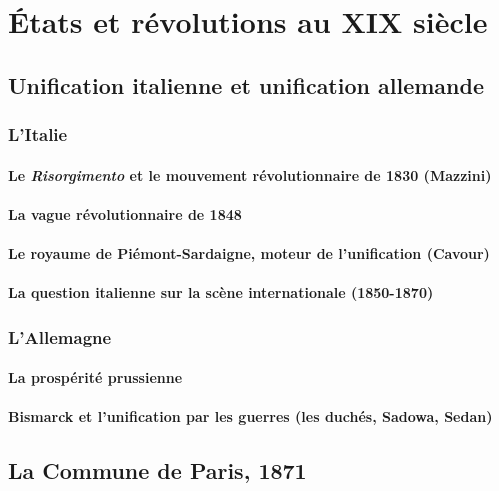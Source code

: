 \documentclass[12pt]{report}
\begin{document}
\chapter{États et révolutions au XIX siècle}

\section{Unification italienne et unification allemande}

\subsection{L'Italie}

\subsubsection{Le \emph{Risorgimento} et le mouvement révolutionnaire de 1830 (Mazzini)}

\subsubsection{La vague révolutionnaire de 1848}

\subsubsection{Le royaume de Piémont-Sardaigne, moteur de l'unification (Cavour)}

\subsubsection{La question italienne sur la scène internationale (1850-1870)}

\subsection{L'Allemagne}

\subsubsection{La prospérité prussienne}

\subsubsection{Bismarck et l'unification par les guerres (les duchés, Sadowa, Sedan)}

\section{La Commune de Paris, 1871}
\end{document}
